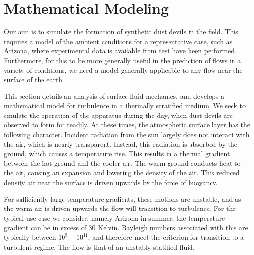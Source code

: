 \section{Mathematical Modeling}
\label{sec:mathmodel}


%
%

Our aim is to simulate the formation of synthetic dust devils in the
field. This requires a model of the ambient conditions for a
representative case, such as Arizona, where experimental data is
available from test have been performed. Furthermore, for this to be
more generally useful in the prediction of flows in a variety of
conditions, we need a model generally applicable to any flow near the
surface of the earth.  

This section details an analysis of surface fluid mechanics, and
develops a mathematical model for turbulence in a thermally stratified
medium. We seek to emulate the operation of the apparatus during the day, 
when dust devils are observed to form for readily. 
At these times, the atmospheric surface layer has the following character. 
Incident radiation from the sun largely does not interact with the
air, which is nearly transparent. Instead, this radiation is absorbed by
the ground, which causes a temperature rise. This results in a thermal
gradient between the hot ground and the cooler air. The warm ground
conducts heat to the air, causing an expansion and lowering the density
of the air. This reduced density air near the surface is driven upwards
by the force of buoyancy.  

For sufficiently large temperature gradients, these motions are
unstable, and as the warm air is driven upwards the flow will transition
to turbulence. For the typical use case we consider, namely Arizona in
summer, the temperature gradient can be in excess of 30 Kelvin. 
Rayleigh numbers associated with this are typically between $10^{9} -
10^{11}$, and therefore meet the criterion for transition to a turbulent
regime. The flow is that of an unstably statified fluid. 

